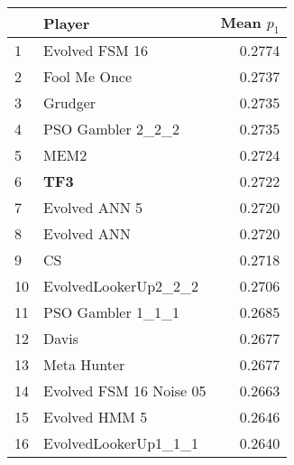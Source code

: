 \begin{tabular}{llr}
\toprule
{} &                   Player &  Mean $p_1$ \\
\midrule
1  &           Evolved FSM 16 &      0.2774 \\
2  &             Fool Me Once &      0.2737 \\
3  &                  Grudger &      0.2735 \\
4  &        PSO Gambler 2\_2\_2 &      0.2735 \\
5  &                     MEM2 &      0.2724 \\
6  &                      \textbf{TF3} &      0.2722 \\
7  &            Evolved ANN 5 &      0.2720 \\
8  &              Evolved ANN &      0.2720 \\
9  &                       CS &      0.2718 \\
10 &     EvolvedLookerUp2\_2\_2 &      0.2706 \\
11 &        PSO Gambler 1\_1\_1 &      0.2685 \\
12 &                    Davis &      0.2677 \\
13 &              Meta Hunter &      0.2677 \\
14 &  Evolved FSM 16 Noise 05 &      0.2663 \\
15 &            Evolved HMM 5 &      0.2646 \\
16 &     EvolvedLookerUp1\_1\_1 &      0.2640 \\
\bottomrule
\end{tabular}

